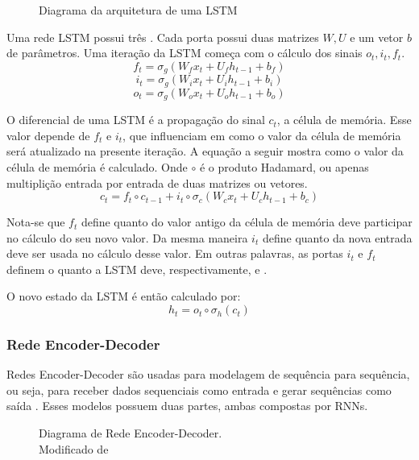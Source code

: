 \begin{figure}
\centering
\caption{Diagrama da arquitetura de uma LSTM}

\label{fig:lstm}
\end{figure}




Uma rede LSTM possui três . Cada porta possui duas matrizes $W,U$ e um
vetor $b$ de parâmetros. Uma iteração da LSTM começa com o cálculo dos sinais
$o_t,i_t,f_t$.\\

\[f_t = \sigma_g(W_fx_t + U_fh_{t-1} + b_f)\]
\[i_t = \sigma_g(W_ix_t + U_ih_{t-1} + b_i)\]
\[o_t = \sigma_g(W_ox_t + U_oh_{t-1} + b_o)\]

O diferencial de uma LSTM é a propagação do sinal $c_t$, a célula de memória.
Esse valor depende de $f_t$ e $i_t$, que influenciam em como o valor da
célula de memória será atualizado na presente iteração. A equação a seguir
mostra como o valor da célula de memória é calculado. Onde $\circ$ é o produto Hadamard, ou apenas multiplição entrada por entrada de
duas matrizes ou vetores. \\

\[c_t = f_t \circ c_{t-1} + i_t \circ \sigma_c(W_cx_t + U_ch_{t-1} + b_c)\]

Nota-se que $f_t$
define quanto do valor antigo da célula de memória deve participar no cálculo do
seu novo valor. 
Da mesma maneira $i_t$ define quanto da nova entrada deve ser usada no cálculo desse valor.
Em outras palavras, as portas $i_t$ e $f_t$ definem o quanto a LSTM deve,
respectivamente,  e .


O novo estado da LSTM é então calculado por: \\
\[h_t = o_t \circ \sigma_h(c_t)\]




\subsubsection{Rede Encoder-Decoder}

Redes Encoder-Decoder são usadas para modelagem de sequência para
sequência, ou seja, para receber dados sequenciais como entrada e gerar
sequências como saída \citep{dlbook}. Esses modelos possuem duas partes, ambas compostas por
RNNs. \\

\begin{figure}[H]
\centering

\caption{ Diagrama de Rede Encoder-Decoder.\\ Modificado de \cite{encdec}}

\end{figure}
  
